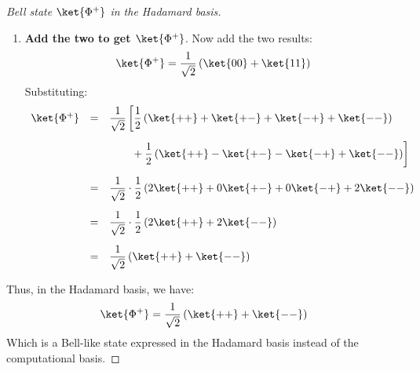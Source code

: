 \begin{examplebox}
\begin{proof}[Bell state $\ket{\Phi^{+}}$ in the Hadamard basis]
\begin{enumerate}
            \item \textbf{Add the two to get $\ket{\Phi^{+}}$}. Now add the two results:
            \begin{equation*}
                \ket{\Phi^{+}} = \dfrac{1}{\sqrt{2}}\left(\ket{00} + \ket{11}\right)
            \end{equation*}
            Substituting:
            \begin{equation*}
                \begin{array}{rcl}
                    \ket{\Phi^{+}} &=& \dfrac{1}{\sqrt{2}} \left[
                        \dfrac{1}{2} \left( \ket{++} + \ket{+-} + \ket{-+} + \ket{--} \right)
                    \right. \\ [1.5em]
                    && \left.
                    \phantom{\dfrac{1}{2}}\hspace{1.2em} + \dfrac{1}{2} \left(\ket{++} - \ket{+-} - \ket{-+} + \ket{--}\right)
                    \right] \\ [1.5em]
                    &=& \dfrac{1}{\sqrt{2}} \cdot \dfrac{1}{2} \left( 2\ket{++} + 0\ket{+-} + 0\ket{-+} + 2\ket{--} \right) \\ [1.5em]
                    &=& \dfrac{1}{\sqrt{2}} \cdot \dfrac{1}{2} \left( 2\ket{++} + 2\ket{--} \right) \\ [1.5em]
                    &=& \dfrac{1}{\sqrt{2}} \left(\ket{++} + \ket{--}\right)
                \end{array}
            \end{equation*}
        \end{enumerate}
        Thus, in the Hadamard basis, we have:
        \begin{equation*}
            \ket{\Phi^{+}} = \dfrac{1}{\sqrt{2}}\left(\ket{++} + \ket{--}\right)
        \end{equation*}
        Which is a Bell-like state expressed in the Hadamard basis instead of the computational basis.
    \end{proof}
\end{examplebox}